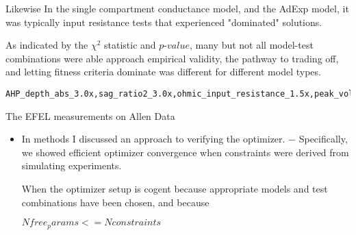 Likewise In the single compartment conductance model, and the AdExp model, it was typically input resistance tests that experienced "dominated" solutions. 

As indicated by the $\chi^{2}$ statistic and $p$-$value$, many but not all model-test combinations were able approach empirical validity, the pathway to trading off, and letting fitness criteria dominate was different for different model types.




\begin{verbatim}
AHP_depth_abs_3.0x,sag_ratio2_3.0x,ohmic_input_resistance_1.5x,peak_voltage_3.0x,voltage_base_3.0x,Spikecount_3.0x,ohmic_input_resistance_vb_ssse_1.5x. 
\end{verbatim}

The EFEL measurements on Allen Data








\begin{itemize}

\item  In methods I discussed an approach to verifying the optimizer.
$-$ Specifically, we showed efficient optimizer convergence when constraints were derived from simulating experiments.

When the optimizer setup is cogent because appropriate models and test combinations have been chosen, and because 

$N free_params <= N constraints$


\end{itemize}

